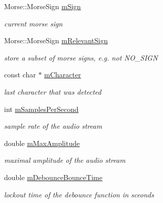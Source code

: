 \begin{DoxyCompactItemize}
Morse\+::\+Morse\+Sign \hyperlink{classMorseDecode_a7f7235efc28159b04c81f58bbec2d0d8}{m\+Sign}
\begin{DoxyCompactList}\small\item\em current morse sign \end{DoxyCompactList}\item 
\mbox{\label{classMorseDecode_a73f8859eb0c298eb3c1ab202515c7d0d}} 
Morse\+::\+Morse\+Sign \hyperlink{classMorseDecode_a73f8859eb0c298eb3c1ab202515c7d0d}{m\+Relevant\+Sign}
\begin{DoxyCompactList}\small\item\em store a subset of morse signs, e.\+g. not N\+O\+\_\+\+S\+I\+GN \end{DoxyCompactList}\item 
\mbox{\label{classMorseDecode_ab249932bd3cd5a80148985b4739b4bd3}} 
const char $\ast$ \hyperlink{classMorseDecode_ab249932bd3cd5a80148985b4739b4bd3}{m\+Character}
\begin{DoxyCompactList}\small\item\em last character that was detected \end{DoxyCompactList}\item 
\mbox{\label{classMorseDecode_a7de8fb071377853000c9b70ee4b6af9e}} 
int \hyperlink{classMorseDecode_a7de8fb071377853000c9b70ee4b6af9e}{m\+Samples\+Per\+Second}
\begin{DoxyCompactList}\small\item\em sample rate of the audio stream \end{DoxyCompactList}\item 
\mbox{\label{classMorseDecode_acacba823317f140412f46653c2917f56}} 
double \hyperlink{classMorseDecode_acacba823317f140412f46653c2917f56}{m\+Max\+Amplitude}
\begin{DoxyCompactList}\small\item\em maximal amplitude of the audio stream \end{DoxyCompactList}\item 
\mbox{\label{classMorseDecode_a93f880a0bbef2a497a971cdec0162a24}} 
double \hyperlink{classMorseDecode_a93f880a0bbef2a497a971cdec0162a24}{m\+Debounce\+Bounce\+Time}
\begin{DoxyCompactList}\small\item\em lockout time of the debounce function in sceonds \end{DoxyCompactList}\item 

\end{DoxyCompactItemize}
